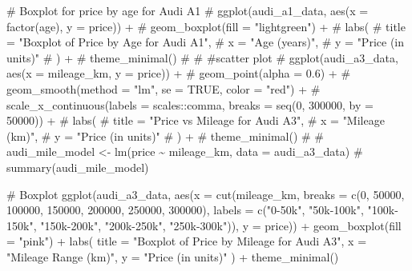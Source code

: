 \documentclass[
  letterpaper,
  DIV=11,
  numbers=noendperiod]{scrartcl}
\newenvironment{Shaded}{\begin{snugshade}}{\end{snugshade}}
\newcommand{\AttributeTok}[1]{\textcolor[rgb]{0.40,0.45,0.13}{#1}}
\newcommand{\CommentTok}[1]{\textcolor[rgb]{0.37,0.37,0.37}{#1}}
\newcommand{\DecValTok}[1]{\textcolor[rgb]{0.68,0.00,0.00}{#1}}
\newcommand{\FunctionTok}[1]{\textcolor[rgb]{0.28,0.35,0.67}{#1}}
\newcommand{\NormalTok}[1]{\textcolor[rgb]{0.00,0.23,0.31}{#1}}
\newcommand{\SpecialCharTok}[1]{\textcolor[rgb]{0.37,0.37,0.37}{#1}}
\newcommand{\StringTok}[1]{\textcolor[rgb]{0.13,0.47,0.30}{#1}}
\begin{document}
\begin{Shaded}
\begin{Highlighting}[]
\CommentTok{\# Boxplot for price by age for Audi A1}
\CommentTok{\# ggplot(audi\_a1\_data, aes(x = factor(age), y = price)) +}
\CommentTok{\#   geom\_boxplot(fill = "lightgreen") +}
\CommentTok{\#   labs(}
\CommentTok{\#     title = "Boxplot of Price by Age for Audi A1",}
\CommentTok{\#     x = "Age (years)",}
\CommentTok{\#     y = "Price (in units)"}
\CommentTok{\#   ) +}
\CommentTok{\#   theme\_minimal()}
\CommentTok{\#       }
\CommentTok{\# \#scatter plot}
\CommentTok{\# ggplot(audi\_a3\_data, aes(x = mileage\_km, y = price)) +}
\CommentTok{\#   geom\_point(alpha = 0.6) +}
\CommentTok{\#   geom\_smooth(method = "lm", se = TRUE, color = "red") +}
\CommentTok{\#   scale\_x\_continuous(labels = scales::comma, breaks = seq(0, 300000, by = 50000)) +}
\CommentTok{\#   labs(}
\CommentTok{\#     title = "Price vs Mileage for Audi A3",}
\CommentTok{\#     x = "Mileage (km)",}
\CommentTok{\#     y = "Price (in units)"}
\CommentTok{\#   ) +}
\CommentTok{\#   theme\_minimal()}
\CommentTok{\# }
\CommentTok{\# audi\_mile\_model \textless{}{-} lm(price \textasciitilde{} mileage\_km, data = audi\_a3\_data)}
\CommentTok{\# summary(audi\_mile\_model)}

\CommentTok{\# Boxplot}
\FunctionTok{ggplot}\NormalTok{(audi\_a3\_data, }\FunctionTok{aes}\NormalTok{(}\AttributeTok{x =} \FunctionTok{cut}\NormalTok{(mileage\_km, }\AttributeTok{breaks =} \FunctionTok{c}\NormalTok{(}\DecValTok{0}\NormalTok{, }\DecValTok{50000}\NormalTok{, }\DecValTok{100000}\NormalTok{, }\DecValTok{150000}\NormalTok{, }\DecValTok{200000}\NormalTok{, }\DecValTok{250000}\NormalTok{, }\DecValTok{300000}\NormalTok{),}
                                \AttributeTok{labels =} \FunctionTok{c}\NormalTok{(}\StringTok{"0{-}50k"}\NormalTok{, }\StringTok{"50k{-}100k"}\NormalTok{, }\StringTok{"100k{-}150k"}\NormalTok{, }\StringTok{"150k{-}200k"}\NormalTok{, }\StringTok{"200k{-}250k"}\NormalTok{, }\StringTok{"250k{-}300k"}\NormalTok{)),}
                        \AttributeTok{y =}\NormalTok{ price)) }\SpecialCharTok{+}
  \FunctionTok{geom\_boxplot}\NormalTok{(}\AttributeTok{fill =} \StringTok{"pink"}\NormalTok{) }\SpecialCharTok{+}
  \FunctionTok{labs}\NormalTok{(}
    \AttributeTok{title =} \StringTok{"Boxplot of Price by Mileage for Audi A3"}\NormalTok{,}
    \AttributeTok{x =} \StringTok{"Mileage Range (km)"}\NormalTok{,}
    \AttributeTok{y =} \StringTok{"Price (in units)"}
\NormalTok{  ) }\SpecialCharTok{+}
  \FunctionTok{theme\_minimal}\NormalTok{()}


\end{Highlighting}
\end{Shaded}
\end{document}
